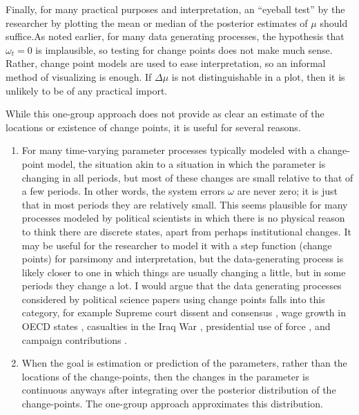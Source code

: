 

Finally, for many practical purposes and interpretation, an ``eyeball test'' by the researcher by plotting the mean or median of the posterior estimates of $\mu$ should suffice.As noted earlier, for many data generating processes, the hypothesis that $\omega_{t} = 0$ is implausible, so testing for change points does not make much sense.
Rather, change point models are used to ease interpretation, so an informal method of visualizing is enough.
If $\Delta \mu$ is not distinguishable in a plot, then it is unlikely to be of any practical import.

While this one-group approach does not provide as clear an estimate of the locations or existence of change points, it is useful for several reasons.
\begin{enumerate}
\item For many time-varying parameter processes typically modeled with a change-point model, the situation akin to a situation in which the parameter is changing in all periods, but most of these changes are small relative to that of a few periods.
  In other words, the system errors $\omega$ are never zero; it is just that in most periods they are relatively small.
  This seems plausible for many processes modeled by political scientists in which there is no physical reason to think there are discrete states, apart from perhaps institutional changes.
  It may be useful for the researcher to model it with a step function (change points) for parsimony and interpretation, but the data-generating process is likely closer to one in which things are usually changing a little, but in some periods they change a lot. 
  I would argue that the data generating processes considered by political science papers using change points falls into this category, for example Supreme court dissent and consensus \parencite{CalderiaZorn1998}, wage growth in OECD states \parencite{WesternKleykamp2004}, casualties in the Iraq War \parencite{Spirling2007a}, presidential use of force \parencite{Park2010}, and campaign contributions \parencite{Blackwell2012}.
\item When the goal is estimation or prediction of the parameters, rather than the locations of the change-points, then the changes in the parameter is continuous anyways after integrating over the posterior distribution of the change-points. 
  The one-group approach approximates this distribution.
\end{enumerate}


